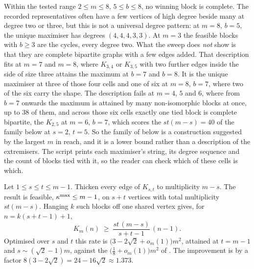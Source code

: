 Within the tested range $2\le m\le8$, $5\le b\le8$, no winning block is complete.
The recorded representatives often have a few vertices of high degree beside
many at degree two or three, but this is not a universal degree pattern:
at $m=8$, $b=5$, the unique maximiser has degrees $(4,4,4,3,3)$.
At $m = 3$ the feasible blocks with $b\ge3$ are the cycles, every degree two. What
the sweep does \emph{not} show is that they are complete bipartite graphs with a
few edges added. That description fits at $m = 7$ and $m = 8$, where $K_{3,4}$
or $K_{3,5}$ with two further edges inside the side of size three attains the
maximum at $b = 7$ and $b = 8$. It is the unique maximiser at three of those
four cells and one of six at $m = 8$, $b = 7$, where two of the six carry the
shape. The description fails at $m = 4$, $5$ and $6$, where from $b = 7$ onwards
the maximum is attained by many non-isomorphic blocks at once, up to $38$ of
them, and across those six cells exactly one tied block is complete bipartite,
the $K_{2,5}$ at $m = 6$, $b = 7$, which scores the $st(m-s) = 40$ of the family
below at $s = 2$, $t = 5$. So the family of 
below is a construction suggested by the largest $m$ in reach, and it is a lower
bound rather than a description of the extremisers. The script prints each maximiser's
 string, its degree sequence and the count of blocks tied with it,
so the reader can check which of these cells is which.

\begin{conjecture}\label{thm:multi-vertex-bipartite}
Let $1 \le s \le t \le m-1$. Thicken every edge of $K_{s,t}$ to multiplicity $m-s$. The result is feasible, $\kappa^{\max} \le m-1$, on $s+t$ vertices with total multiplicity $st(m-s)$. Hanging $k$ such blocks off one shared vertex gives, for $n = k(s+t-1)+1$,
\[
    K_m(n) \;\ge\; \frac{st\,(m-s)}{s+t-1}\,(n-1) .
\]
Optimised over $s$ and $t$ this rate is $\bigl(3 - 2\sqrt{2} + o_m(1)\bigr)m^2$, attained at $t = m-1$ and $s \sim (\sqrt{2}-1)m$, against the $\bigl(\tfrac18 + o_m(1)\bigr)m^2$ of . The improvement is by a factor $8(3-2\sqrt{2}) = 24 - 16\sqrt{2} \approx 1.373$.
\end{conjecture}

